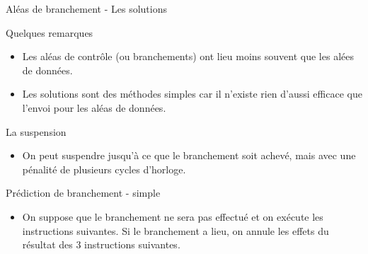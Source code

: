 %
\begin{Frame}{Aléas de branchement - Les solutions}

  \begin{block}{Quelques remarques}
       \begin{center}
 	\begin{itemize}
          \item Les aléas de contrôle (ou branchements) ont lieu moins souvent que les alées de données.
          \item Les solutions sont des méthodes simples car il n'existe rien d'aussi efficace que l'envoi pour les aléas de données. 
        \end{itemize}
       \end{center}
      \end{block}   

\begin{block}{La suspension}
       \begin{center}
 	\begin{itemize}
          \item On peut suspendre jusqu'à ce que le branchement soit achevé, mais avec une pénalité de plusieurs cycles d'horloge.
        \end{itemize}
       \end{center}
      \end{block}   
 
\begin{block}{Prédiction de branchement - simple}
       \begin{center}
 	\begin{itemize}
          \item On suppose que le branchement ne sera pas effectué et on exécute les instructions suivantes. Si le branchement a lieu, on annule les effets du résultat des 3 instructions suivantes.
        \end{itemize}
       \end{center}
      \end{block}  


\end{Frame}


